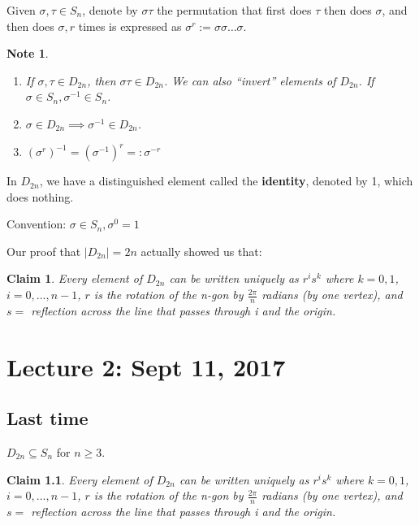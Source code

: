 \documentclass[11pt, oneside]{book}
\theoremstyle{break}
\newtheorem{claim}{Claim}[section]
\newtheorem*{note}{Note}
\begin{document}
Given $\sigma, \tau \in S_n$, denote by $\sigma\tau$ the permutation that first does $\tau$ then does $\sigma$, and then does $\sigma, r$ times is expressed as
$\sigma^r := \sigma\sigma\hdots\sigma$.

\begin{note}
    \begin{enumerate}
        \item If $\sigma, \tau \in D_{2n}$, then $\sigma\tau \in D_{2n}$. We can also ``invert'' elements of $D_{2n}$. If $\sigma \in S_n, \sigma^{-1} \in S_n$.
        \item $\sigma \in D_{2n} \implies \sigma^{-1} \in D_{2n}$.
        \item $(\sigma^r)^{-1} = (\sigma^{-1})^r =: \sigma^{-r}$
    \end{enumerate}
\end{note}

In $D_{2n}$, we have a distinguished element called the \textbf{identity}, denoted by 1, which does nothing.

Convention: $\sigma \in S_n, \sigma^0 = 1$

Our proof that $|D_{2n}| = 2n$ actually showed us that:

\begin{claim}
    Every element of $D_{2n}$ can be written uniquely as $r^i s^k$ where $k = 0, 1$, $i = 0, ..., n - 1$, $r$ is the rotation of the n-gon by $\frac{2\pi}{n}$ radians (by one vertex), and $s =$ reflection across the line that passes through i and the origin.
\end{claim}

\chapter{Lecture 2: Sept 11, 2017}\label{lec2}

\section{Last time}

$D_{2n} \subseteq S_n$ for $n \geq 3$.

\begin{claim}
    Every element of $D_{2n}$ can be written uniquely as $r^i s^k$ where $k = 0, 1$, $i = 0, ..., n - 1$, $r$ is the rotation of the n-gon by $\frac{2\pi}{n}$ radians (by one vertex), and $s =$ reflection across the line that passes through i and the origin.
\end{claim}
\end{document}
